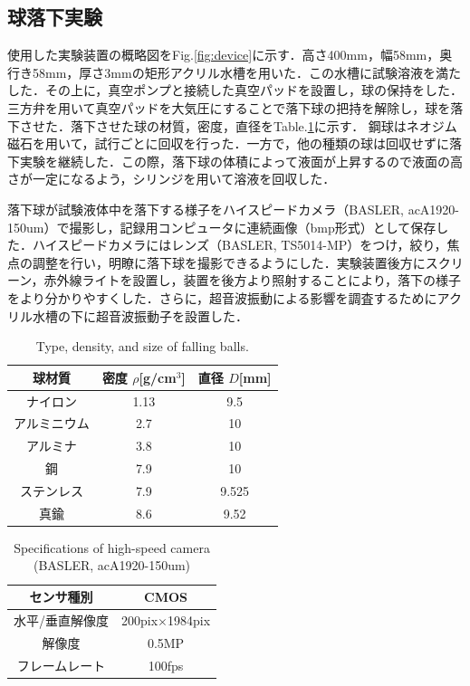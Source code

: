 \newpage

\subsection{球落下実験}

使用した実験装置の概略図をFig.\ref{fig:device}に示す．高さ400mm，幅58mm，奥行き58mm，厚さ3mmの矩形アクリル水槽を用いた．この水槽に試験溶液を満たした．その上に，真空ポンプと接続した真空パッドを設置し，球の保持をした．三方弁を用いて真空パッドを大気圧にすることで落下球の把持を解除し，球を落下させた．落下させた球の材質，密度，直径をTable.\ref{table:ball}に示す．
鋼球はネオジム磁石を用いて，試行ごとに回収を行った．一方で，他の種類の球は回収せずに落下実験を継続した．この際，落下球の体積によって液面が上昇するので液面の高さが一定になるよう，シリンジを用いて溶液を回収した．

落下球が試験液体中を落下する様子をハイスピードカメラ（BASLER, acA1920-150um）で撮影し，記録用コンピュータに連続画像（bmp形式）として保存した．ハイスピードカメラにはレンズ（BASLER, TS5014-MP）をつけ，絞り，焦点の調整を行い，明瞭に落下球を撮影できるようにした．実験装置後方にスクリーン，赤外線ライトを設置し，装置を後方より照射することにより，落下の様子をより分かりやすくした．さらに，超音波振動による影響を調査するためにアクリル水槽の下に超音波振動子を設置した．

\begin{table}[ht]
    \centering
    \caption{Type, density, and size of falling balls.}
    \label{table:ball}
    \begin{tabular}{c|c|c}\hline
        球材質       & 密度 $\rho$[g/cm$^3$] & 直径 $D$[mm] \\ \hline
        ナイロン     & 1.13                  & 9.5          \\ \hline
        アルミニウム & 2.7                   & 10           \\ \hline
        アルミナ     & 3.8                   & 10           \\ \hline
        鋼           & 7.9                   & 10           \\ \hline
        ステンレス   & 7.9                   & 9.525        \\ \hline
        真鍮         & 8.6                   & 9.52         \\ \hline
    \end{tabular}
\end{table}

\begin{table}[ht]
    \centering
    \caption{Specifications of high-speed camera (BASLER, acA1920-150um)}
    \label{table:camera}
    \begin{tabular}{c|c}\hline
        センサ種別      & CMOS                  \\ \hline
        水平/垂直解像度 & 200pix$\times$1984pix \\ \hline
        解像度          & 0.5MP                 \\ \hline
        フレームレート  & 100fps                \\ \hline
    \end{tabular}
\end{table}

